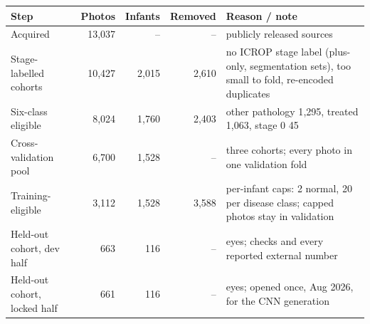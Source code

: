 \begin{tabular}{@{}lrrr>{\raggedright\arraybackslash}p{7.6cm}@{}}
\toprule
Step & Photos & Infants & Removed & Reason / note\\
\midrule
Acquired & 13{,}037 & -- & -- & 11 publicly released sources \\
Stage-labelled cohorts & 10{,}427 & 2{,}015 & 2{,}610 & no ICROP stage label (plus-only, segmentation sets), too small to fold, re-encoded duplicates \\
Six-class eligible & 8{,}024 & 1{,}760 & 2{,}403 & other pathology 1{,}295, treated 1{,}063, stage 0 45 \\
Cross-validation pool & 6{,}700 & 1{,}528 & -- & three cohorts; every photo in one validation fold \\
Training-eligible & 3{,}112 & 1{,}528 & 3{,}588 & per-infant caps: 2 normal, 20 per disease class; capped photos stay in validation \\
Held-out cohort, dev half & 663 & 116 & -- & 230 eyes; checks and every reported external number \\
Held-out cohort, locked half & 661 & 116 & -- & 230 eyes; opened once, Aug 2026, for the CNN generation \\
\bottomrule
\end{tabular}

